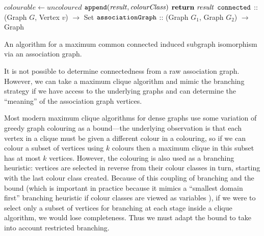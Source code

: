 \documentclass{llncs}
\begin{document}
\begin{algorithm}[p]
{{        \nl $\mathit{colourable} \gets \mathit{uncoloured}$ \;
        \nl {}
        \nl $\FuncSty{append}(\mathit{result}, \mathit{colourClass})$ \;
    }
    \nl $\KwSty{return} ~ \mathit{result}$ \;
}
\vspace{0.9ex}
\nl $\FuncSty{connected}$ :: (Graph $G$, Vertex $v$) $\rightarrow$ Set \;
\nl {}
\vspace{0.9ex}
\nl $\FuncSty{associationGraph}$ :: (Graph $G_1$, Graph $G_2$) $\rightarrow$ Graph \;
\nl {}
\caption{An algorithm for a maximum common connected induced subgraph isomorphism via an association graph.}
\label{algorithm:mccis}
\end{algorithm}

It is not possible to determine connectedness from a raw association graph. However, we can take a
maximum clique algorithm and mimic the branching strategy if we have access to the underlying graphs
and can determine the ``meaning'' of the association graph vertices.

Most modern maximum clique algorithms for dense graphs use some variation of greedy graph colouring
as a bound---the underlying observation is that each vertex in a clique must be given a different
colour in a colouring, so if we can colour a subset of vertices using $k$ colours then a maximum
clique in this subset has at most $k$ vertices. However, the colouring is also used as a branching
heuristic: vertices are selected in reverse from their colour classes in turn, starting with the
last colour class created. Because of this coupling of branching and the bound (which is important
in practice because it mimics a ``smallest domain first'' branching heuristic if colour classes are
viewed as variables \cite{DBLP:conf/cp/McCreeshP14}), if we were to select only a subset of vertices for
branching at each stage inside a clique algorithm, we would lose completeness. Thus we must adapt
the bound to take into account restricted branching.
\end{document}
